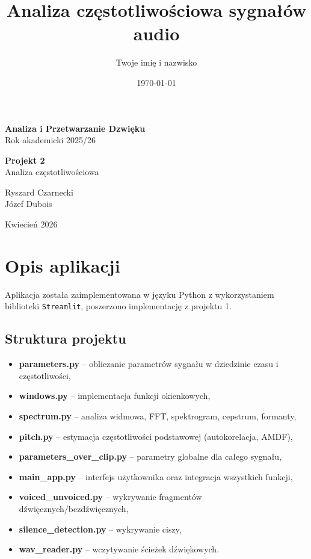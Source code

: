 \documentclass[a4paper,12pt]{article}
\title{Analiza częstotliwościowa sygnałów audio}
\author{Twoje imię i nazwisko}
\date{\today}
\begin{document}
	\begin{titlepage}
		\centering
		\vspace*{2cm}
		
		{\LARGE\bfseries Analiza i Przetwarzanie Dzwi\k{e}ku}\\[0.4cm]
		{\large Rok akademicki 2025/26}
		
		\vspace{2cm}
		
		{\Huge\bfseries Projekt 2}\\[0.6cm]
		{\Large Analiza częstotliwościowa}
		
		\vspace{3cm}
		
		{\Large
			Ryszard Czarnecki\\[0.3cm]
			J\'ozef Dubois
		}
		
		\vfill
		{\large Kwiecie\'n 2026}
	\end{titlepage}
	
	\tableofcontents
	\newpage
	
\section{Opis aplikacji}


Aplikacja została zaimplementowana w języku Python z wykorzystaniem biblioteki \texttt{Streamlit}, poszerzono implementację z projektu 1. 


\subsection{Struktura projektu}
\begin{itemize}
	\item \textbf{parameters.py} -- obliczanie parametrów sygnału w dziedzinie czasu i częstotliwości,
	\item \textbf{windows.py} -- implementacja funkcji okienkowych,
	\item \textbf{spectrum.py} -- analiza widmowa, FFT, spektrogram, cepstrum, formanty,
	\item \textbf{pitch.py} -- estymacja częstotliwości podstawowej (autokorelacja, AMDF),
	\item \textbf{parameters\_over\_clip.py} -- parametry globalne dla całego sygnału,
	\item \textbf{main\_app.py} -- interfejs użytkownika oraz integracja wszystkich funkcji,
	\item \textbf{voiced\_unvoiced.py} -- wykrywanie fragmentów dźwięcznych/bezdźwięcznych,
	\item \textbf{silence\_detection.py} -- wykrywanie ciszy,
	\item \textbf{wav\_reader.py} -- wczytywanie ścieżek dźwiękowych.
\end{itemize}
\end{document}
